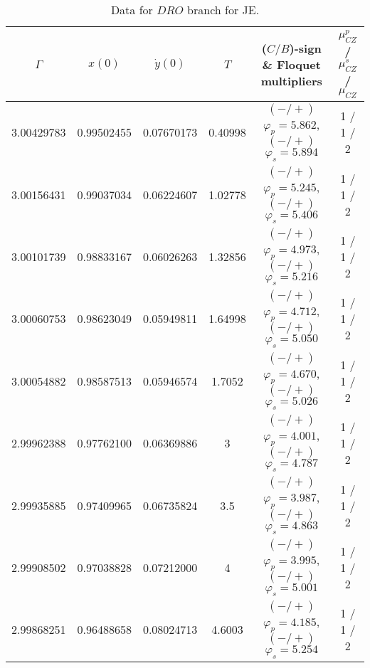 \documentclass[reqno, 11pt]{amsart}
\theoremstyle{plain}
\theoremstyle{definition}
\theoremstyle{remark}
\begin{document}
\begin{table}[h]\fontsize{10}{10}\selectfont \centering
\caption{Data for $DRO$ branch for JE.}
	\begin{tabular}{c|c|c|c|c|c}
 \hline
		$\Gamma$ & $x(0)$ & $\dot{y}(0)$ & $T$ & ($C/B$)-sign \& Floquet multipliers & $\mu_{CZ}^p$ / $\mu_{CZ}^s$ / $\mu_{CZ}$\\
		\hline 3.00429783 & 0.99502455 & 0.07670173 & 0.40998 & $(-/+)$ $\varphi_p = 5.862$, $(-/+)$ $\varphi_s = 5.894$ & 1 / 1 / 2\\
		3.00156431 & 0.99037034 & 0.06224607 & 1.02778 & $(-/+)$ $\varphi_p = 5.245$, $(-/+)$ $\varphi_s = 5.406$ & 1 / 1 / 2 \\
		3.00101739 & 0.98833167 & 0.06026263 & 1.32856 & $(-/+)$ $\varphi_p = 4.973$, $(-/+)$ $\varphi_s = 5.216$ & 1 / 1 / 2 \\
		3.00060753 & 0.98623049 & 0.05949811 & 1.64998 & $(-/+)$ $\varphi_p = 4.712$, $(-/+)$ $\varphi_s = 5.050$ & 1 / 1 / 2 \\
        3.00054882 & 0.98587513 & 0.05946574 & 1.7052 & $(-/+)$ $\varphi_p = 4.670$, $(-/+)$ $\varphi_s = 5.026$ & 1 / 1 / 2 \\
		2.99962388 & 0.97762100 & 0.06369886 & 3 & $(-/+)$ $\varphi_p = 4.001$, $(-/+)$ $\varphi_s = 4.787$ & 1 / 1 / 2 \\
		2.99935885 & 0.97409965 & 0.06735824 & 3.5 & $(-/+)$ $\varphi_p = 3.987$, $(-/+)$ $\varphi_s = 4.863$ & 1 / 1 / 2 \\
		2.99908502 & 0.97038828 & 0.07212000 & 4 & $(-/+)$ $\varphi_p = 3.995$, $(-/+)$ $\varphi_s = 5.001$ & 1 / 1 / 2 \\
		2.99868251 & 0.96488658 & 0.08024713 & 4.6003 & $(-/+)$ $\varphi_p = 4.185$, $(-/+)$ $\varphi_s = 5.254$ & 1 / 1 / 2
	\end{tabular}
	
	\label{data_dro}
\end{table}
\end{document}
